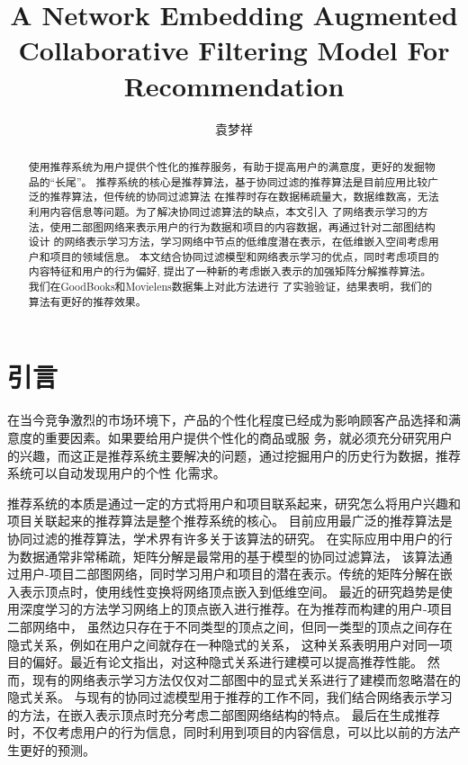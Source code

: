 \documentclass[lang=cn,11pt]{elegantpaper}
\title{A Network Embedding Augmented Collaborative Filtering Model For Recommendation}
\author{袁梦祥}
\institute{安徽大学大数据与云服务工程实验室}
\date{}
\begin{document}
\maketitle

\begin{abstract}
\noindent 使用推荐系统为用户提供个性化的推荐服务，有助于提高用户的满意度，更好的发掘物品的“长尾”。
推荐系统的核心是推荐算法，基于协同过滤的推荐算法是目前应用比较广泛的推荐算法，但传统的协同过滤算法
在推荐时存在数据稀疏量大，数据维数高，无法利用内容信息等问题。为了解决协同过滤算法的缺点，本文引入
了网络表示学习的方法，使用二部图网络来表示用户的行为数据和项目的内容数据，再通过针对二部图结构设计
的网络表示学习方法，学习网络中节点的低维度潜在表示，在低维嵌入空间考虑用户和项目的领域信息。
本文结合协同过滤模型和网络表示学习的优点，同时考虑项目的内容特征和用户的行为偏好,
提出了一种新的考虑嵌入表示的加强矩阵分解推荐算法。我们在GoodBooks和Movielens数据集上对此方法进行
了实验验证，结果表明，我们的算法有更好的推荐效果。
\end{abstract}


\section{引言}

在当今竞争激烈的市场环境下，产品的个性化程度已经成为影响顾客产品选择和满意度的重要因素。如果要给用户提供个性化的商品或服
务，就必须充分研究用户的兴趣，而这正是推荐系统主要解决的问题，通过挖掘用户的历史行为数据，推荐系统可以自动发现用户的个性
化需求。

推荐系统的本质是通过一定的方式将用户和项目联系起来，研究怎么将用户兴趣和项目关联起来的推荐算法是整个推荐系统的核心。
目前应用最广泛的推荐算法是协同过滤的推荐算法，学术界有许多关于该算法的研究\cite{Linden2003,Miranda2009,Sarwar2001a,Su2009}。
在实际应用中用户的行为数据通常非常稀疏，矩阵分解是最常用的基于模型的协同过滤算法\cite{Salakhutdinov2007,Koren2009}，
该算法通过用户-项目二部图网络，同时学习用户和项目的潜在表示。传统的矩阵分解在嵌入表示顶点时，使用线性变换将网络顶点嵌入到低维空间。
最近的研究趋势是使用深度学习的方法学习网络上的顶点嵌入\cite{He2017}进行推荐。在为推荐而构建的用户-项目二部网络中，
虽然边只存在于不同类型的顶点之间，但同一类型的顶点之间存在隐式关系，例如在用户之间就存在一种隐式的关系，
这种关系表明用户对同一项目的偏好。最近有论文指出，对这种隐式关系进行建模可以提高推荐性能\cite{Yu2018}。
然而，现有的网络表示学习方法\cite{Perozzi2014,Grover2016,Tang2015}仅仅对二部图中的显式关系进行了建模而忽略潜在的隐式关系。
与现有的协同过滤模型用于推荐的工作不同，我们结合网络表示学习的方法，在嵌入表示顶点时充分考虑二部图网络结构的特点。
最后在生成推荐时，不仅考虑用户的行为信息，同时利用到项目的内容信息，可以比以前的方法产生更好的预测。
\end{document}
